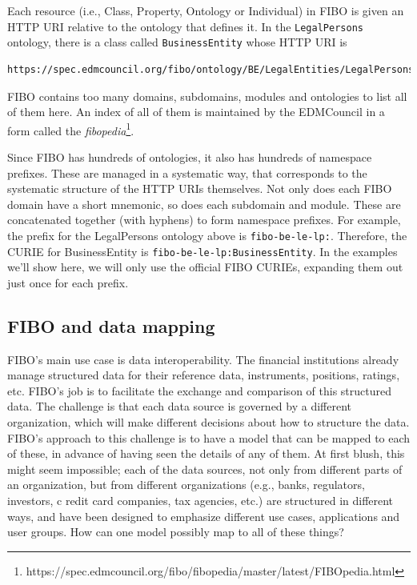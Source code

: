 Each resource (i.e., Class, Property, Ontology or Individual) in FIBO is given an HTTP URI relative to the 
ontology that defines it.  In the \texttt{LegalPersons}
ontology, there is a class called \texttt{BusinessEntity} whose HTTP URI is 

\begin{lstlisting}
https://spec.edmcouncil.org/fibo/ontology/BE/LegalEntities/LegalPersons/BusinessEntity
\end{lstlisting}

FIBO contains too many domains, subdomains, modules and ontologies to list all of them here. An index of all of them
is maintained by the EDMCouncil in a form called 
the \emph{fibopedia}\footnote{https://spec.edmcouncil.org/fibo/fibopedia/master/latest/FIBOpedia.html}.  

Since FIBO has hundreds of ontologies, it also has hundreds of namespace prefixes.  These are managed in a systematic way,
that corresponds to the systematic structure of the HTTP URIs themselves.  Not only does each FIBO domain have a short mnemonic, so 
does each subdomain and module.  These are concatenated together (with hyphens) to form namespace prefixes.  For example, the 
prefix for the LegalPersons ontology above is \texttt{fibo-be-le-lp:}.  Therefore, the CURIE for BusinessEntity 
is \texttt{fibo-be-le-lp:BusinessEntity}.  In the examples we'll show here, we will only use the official FIBO CURIEs, expanding
them out just once for each prefix. 

\subsection{FIBO and data mapping}

FIBO's main use case is data interoperability.  The financial institutions already manage structured data for their reference
data, instruments, positions, ratings, etc.  FIBO's job is to facilitate the exchange and comparison of this structured data. 
The challenge is that each data source is governed by a different organization, 
which will make different decisions about how to 
structure the data.  FIBO's approach to this challenge is to have a model 
that can be mapped to each of these, in advance of having seen the details 
of any of them.   At first blush, this might seem impossible; each of the 
data sources, not only from different parts of an organization, but 
from different organizations (e.g., banks, regulators, investors, c
redit card companies, tax agencies, etc.) are structured in different ways, 
and 
have been designed to emphasize different use cases, applications and
user groups. 
How can one model 
possibly map to all of these things?

